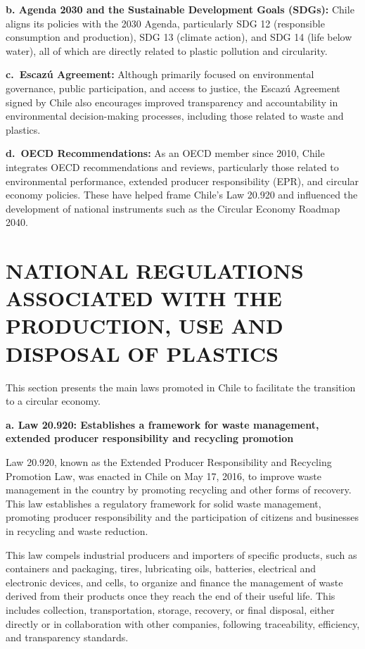 \documentclass[
  12pt,
  oneside]{book}
\begin{document}
\textbf{b. Agenda 2030 and the Sustainable Development Goals (SDGs):}
Chile aligns its policies with the 2030 Agenda, particularly SDG 12
(responsible consumption and production), SDG 13 (climate action), and
SDG 14 (life below water), all of which are directly related to plastic
pollution and circularity.

\textbf{c.~Escazú Agreement:} Although primarily focused on
environmental governance, public participation, and access to justice,
the Escazú Agreement signed by Chile also encourages improved
transparency and accountability in environmental decision-making
processes, including those related to waste and plastics.

\textbf{d.~OECD Recommendations:} As an OECD member since 2010, Chile
integrates OECD recommendations and reviews, particularly those related
to environmental performance, extended producer responsibility (EPR),
and circular economy policies. These have helped frame Chile's Law
20.920 and influenced the development of national instruments such as
the Circular Economy Roadmap 2040.

\section{NATIONAL REGULATIONS ASSOCIATED WITH THE PRODUCTION, USE AND
DISPOSAL OF
PLASTICS}\label{national-regulations-associated-with-the-production-use-and-disposal-of-plastics-1}

This section presents the main laws promoted in Chile to facilitate the
transition to a circular economy.

\textbf{a. Law 20.920: Establishes a framework for waste management,
extended producer responsibility and recycling promotion}

Law 20.920, known as the Extended Producer Responsibility and Recycling
Promotion Law, was enacted in Chile on May 17, 2016, to improve waste
management in the country by promoting recycling and other forms of
recovery. This law establishes a regulatory framework for solid waste
management, promoting producer responsibility and the participation of
citizens and businesses in recycling and waste reduction.

This law compels industrial producers and importers of specific
products, such as containers and packaging, tires, lubricating oils,
batteries, electrical and electronic devices, and cells, to organize and
finance the management of waste derived from their products once they
reach the end of their useful life. This includes collection,
transportation, storage, recovery, or final disposal, either directly or
in collaboration with other companies, following traceability,
efficiency, and transparency standards.
\end{document}
